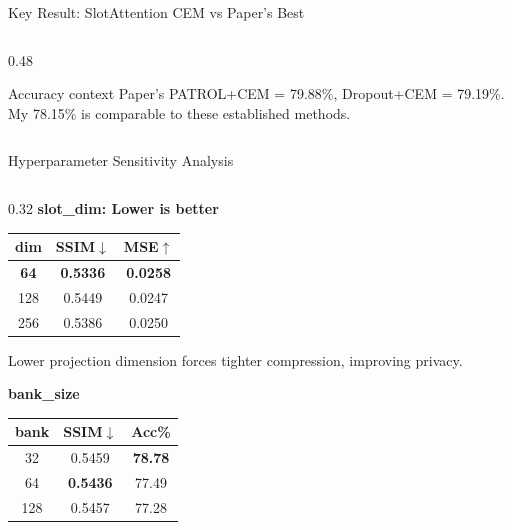 \documentclass[aspectratio=169, 10pt]{beamer}
\begin{document}
\begin{frame}{Key Result: SlotAttention CEM vs Paper's Best}
\begin{columns}[T]
\begin{column}{0.48\textwidth}
\vspace{0.1cm}
\begin{block}{\small Accuracy context}
\small Paper's PATROL+CEM = 79.88\%, Dropout+CEM = 79.19\%. My 78.15\% is comparable to these established methods.
\end{block}
\end{column}
\end{columns}

\end{frame}

\begin{frame}{Hyperparameter Sensitivity Analysis}
\vspace{-0.1cm}

\begin{columns}[T]
\begin{column}{0.32\textwidth}
\textbf{slot\_dim: Lower is better}

\vspace{0.05cm}
\scriptsize
\begin{tabular}{ccc}
\toprule
\textbf{dim} & \textbf{SSIM}$\downarrow$ & \textbf{MSE}$\uparrow$ \\
\midrule
\rowcolor{green!12}
\textbf{64} & \textbf{0.5336} & \textbf{0.0258} \\
128 & 0.5449 & 0.0247 \\
256 & 0.5386 & 0.0250 \\
\bottomrule
\end{tabular}

\vspace{0.1cm}
\small
Lower projection dimension forces tighter compression, improving privacy.

\vspace{0.2cm}
\textbf{bank\_size}

\vspace{0.1cm}
\scriptsize
\begin{tabular}{ccc}
\toprule
\textbf{bank} & \textbf{SSIM}$\downarrow$ & \textbf{Acc\%} \\
\midrule
32 & 0.5459 & \textbf{78.78} \\
\rowcolor{green!8}
64 & \textbf{0.5436} & 77.49 \\
128 & 0.5457 & 77.28 \\
\bottomrule
\end{tabular}


\end{column}
\end{columns}
\end{frame}
\end{document}
